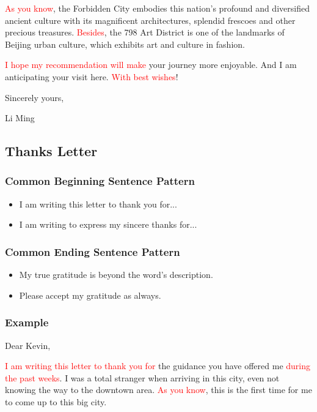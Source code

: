 \documentclass{article}
\begin{document}
\par \textcolor{red}{As you know}, the Forbidden City embodies this nation's profound and diversified ancient culture with its magnificent architectures, splendid frescoes and other precious treasures. \textcolor{red}{Besides}, the 798 Art District is one of the landmarks of Beijing urban culture, which exhibits art and culture in fashion.

\par \textcolor{red}{I hope my recommendation will make} your journey more enjoyable. And I am anticipating your visit here. \textcolor{red}{With best wishes}!

\hfill Sincerely yours,

\hfill Li Ming


\subsection{Thanks Letter}
\label{sec:letter}

\subsubsection{Common Beginning Sentence Pattern}
\label{sec:comm-begnn-sent}
\begin{itemize}
\item I am writing this letter to thank you for...
\item I am writing to express my sincere thanks for...
\end{itemize}

\subsubsection{Common Ending Sentence Pattern}
\label{sec:comm-ending-sent-2}
\begin{itemize}
\item My true gratitude is beyond the word's description.
\item Please accept my gratitude as always.
\end{itemize}

\subsubsection{Example}
\label{sec:example-2}
Dear Kevin,

\par \textcolor{red}{I am writing this letter to thank you for} the guidance you have
offered me \textcolor{red}{during the past weeks}. I was a total stranger when arriving in
this city, even not knowing the way to the downtown area. \textcolor{red}{As you know},
this is the first time for me to come up to this big city.
\end{document}
